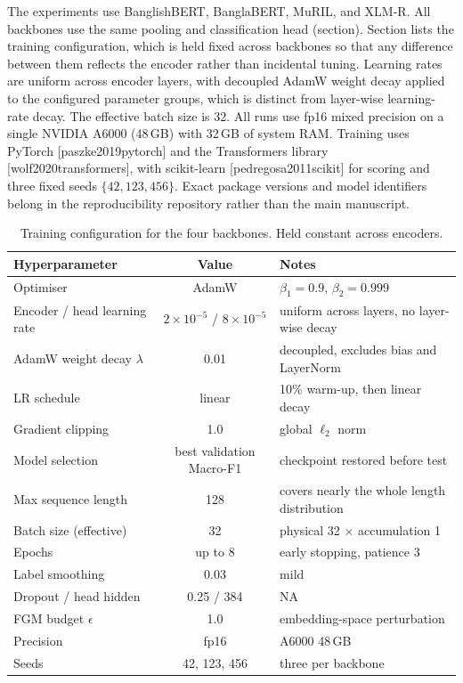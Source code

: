 \documentclass[11pt,a4paper]{article}
\def\citep#1{[#1]}%
\def\Cref#1{Section}%
\def\cref#1{section}%
\begin{document}
The experiments use BanglishBERT, BanglaBERT, MuRIL, and XLM-R. All backbones use the same pooling and classification head (\cref{sec:head}). \Cref{tab:hparams} lists the training configuration, which is held fixed across backbones so that any difference between them reflects the encoder rather than incidental tuning. Learning rates are uniform across encoder layers, with decoupled AdamW weight decay applied to the configured parameter groups, which is distinct from layer-wise learning-rate decay. The effective batch size is 32. All runs use fp16 mixed precision on a single NVIDIA A6000 (48\,GB) with 32\,GB of system RAM. Training uses PyTorch \citep{paszke2019pytorch} and the Transformers library \citep{wolf2020transformers}, with scikit-learn \citep{pedregosa2011scikit} for scoring and three fixed seeds $\{42, 123, 456\}$. Exact package versions and model identifiers belong in the reproducibility repository rather than the main manuscript.

\begin{table}[!htbp]
\centering
\caption{Training configuration for the four backbones. Held constant across encoders.}
\label{tab:hparams}
\small
\begin{tabularx}{\textwidth}{@{}lcX@{}}
\toprule
\textbf{Hyperparameter} & \textbf{Value} & \textbf{Notes} \\
\midrule
Optimiser & AdamW & $\beta_1 = 0.9$, $\beta_2 = 0.999$ \\
Encoder / head learning rate & $2\times10^{-5}$ / $8\times10^{-5}$ & uniform across layers, no layer-wise decay \\
AdamW weight decay $\lambda$ & 0.01 & decoupled, excludes bias and LayerNorm \\
LR schedule & linear & 10\% warm-up, then linear decay \\
Gradient clipping & 1.0 & global $\ell_2$ norm \\
Model selection & best validation Macro-F1 & checkpoint restored before test \\
Max sequence length & 128 & covers nearly the whole length distribution \\
Batch size (effective) & 32 & physical 32 $\times$ accumulation 1 \\
Epochs & up to 8 & early stopping, patience 3 \\
Label smoothing & 0.03 & mild \\
Dropout / head hidden & 0.25 / 384 & NA \\
FGM budget $\epsilon$ & 1.0 & embedding-space perturbation \\
Precision & fp16 & A6000 48\,GB \\
Seeds & 42, 123, 456 & three per backbone \\
\bottomrule
\end{tabularx}
\end{table}
\end{document}
